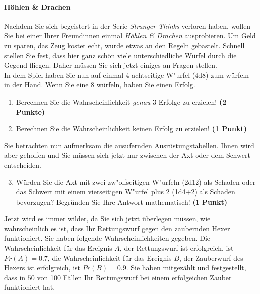 \documentclass[a4paper, 9pt]{scrartcl}\usepackage[]{graphicx}\usepackage[]{xcolor}
\begin{document}
\paragraph{H{\"o}hlen \& Drachen}



Nachdem Sie sich begeistert in der Serie \textit{Stranger Thinks} verloren
haben, wollen Sie bei einer Ihrer Freundinnen einmal \textit{H{\"o}hlen \& Drachen}
ausprobieren. Um Geld zu sparen, das Zeug kostet echt, wurde etwas an den
Regeln gebastelt. Schnell stellen Sie fest, dass hier ganz sch{\"o}n viele
unterschiedliche W{\"u}rfel durch die Gegend fliegen. Daher m{\"u}ssen Sie sich
jetzt einiges an Fragen stellen. \\%

In dem Spiel haben Sie nun auf einmal 4 achtseitige W{"u}rfel (4d8) zum w{\"u}rfeln in der Hand. Wenn Sie eine 8 w{\"u}rfeln,
haben Sie einen Erfolg.

\begin{enumerate}
\item Berechnen Sie die Wahrscheinlichkeit \textit{genau}
  3 Erfolge zu erzielen!  \textbf{(2 Punkte)}
\item Berechnen Sie die Wahrscheinlichkeit keinen Erfolg zu erzielen!
  \textbf{(1 Punkt)}
\end{enumerate}

Sie betrachten nun aufmerksam die ausufernden Ausr{\"u}stungstabellen. Ihnen
wird aber geholfen und Sie m{\"u}ssen sich jetzt nur zwischen der Axt oder dem
Schwert entscheiden.

\begin{enumerate}
  \setcounter{enumi}{2}
\item W{\"u}rden Sie die Axt mit zwei zw{"o}lfseitigen W{"u}rfeln (2d12) als Schaden oder
  das Schwert mit einem vierseitigen W{"u}rfel plus 2 (1d4+2) als Schaden bevorzugen?
  Begr{\"u}nden Sie Ihre Antwort mathematisch! \textbf{(1 Punkt)}
\end{enumerate}

Jetzt wird es immer wilder, da Sie sich jetzt {\"u}berlegen m{\"u}ssen, wie
wahrscheinlich es ist, dass Ihr Rettungswurf gegen den zaubernden Hexer
funktioniert. Sie haben folgende Wahrscheinlichkeiten gegeben. Die
Wahrscheinlichkeit f{\"u}r das Ereignis $A$, der Rettungswurf ist erfolgreich,
ist $Pr(A) = 0.7$, die Wahrscheinlichkeit f{\"u}r das Ereignis $B$,
der Zauberwurf des Hexers ist erfolgreich, ist $Pr(B) = 0.9$. Sie
haben mitgez{\"a}hlt und festgestellt, dass in $50$ von 100 F{\"a}llen
Ihr Rettungswurf bei einem erfolgeichen Zauber funktioniert hat.  
\end{document}
